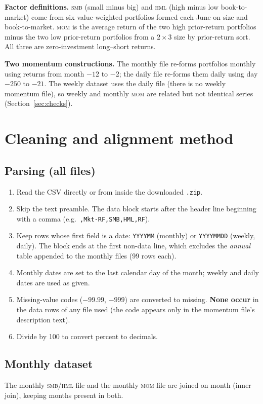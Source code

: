 \documentclass[11pt]{article}
\newcommand{\SMB}{\textsc{smb}}
\newcommand{\HML}{\textsc{hml}}
\newcommand{\MOM}{\textsc{mom}}
\begin{document}
\textbf{Factor definitions.} \SMB{} (small minus big) and \HML{} (high minus low book-to-market) come from six value-weighted portfolios formed each June on size and book-to-market. \MOM{} is the average return of the two high prior-return portfolios minus the two low prior-return portfolios from a $2\times3$ size by prior-return sort. All three are zero-investment long--short returns.

\textbf{Two momentum constructions.} The monthly file re-forms portfolios monthly using returns from month $-12$ to $-2$; the daily file re-forms them daily using day $-250$ to $-21$. The weekly dataset uses the daily file (there is no weekly momentum file), so weekly and monthly \MOM{} are related but not identical series (Section~\ref{sec:checks}).

\section{Cleaning and alignment method}

\subsection{Parsing (all files)}
\begin{enumerate}
\item Read the CSV directly or from inside the downloaded \texttt{.zip}.
\item Skip the text preamble. The data block starts after the header line beginning with a comma (e.g.\ \texttt{,Mkt-RF,SMB,HML,RF}).
\item Keep rows whose first field is a date: \texttt{YYYYMM} (monthly) or \texttt{YYYYMMDD} (weekly, daily). The block ends at the first non-data line, which excludes the \emph{annual} table appended to the monthly files (99 rows each).
\item Monthly dates are set to the last calendar day of the month; weekly and daily dates are used as given.
\item Missing-value codes ($-99.99$, $-999$) are converted to missing. \textbf{None occur} in the data rows of any file used (the code appears only in the momentum file's description text).
\item Divide by 100 to convert percent to decimals.
\end{enumerate}

\subsection{Monthly dataset}
The monthly \SMB/\HML{} file and the monthly \MOM{} file are joined on month (inner join), keeping months present in both.
\end{document}
